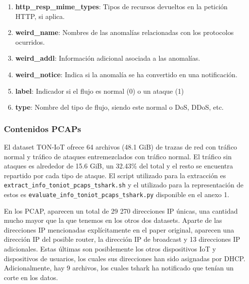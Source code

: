 \begin{enumerate}
  \item \textbf{http\_resp\_mime\_types}: Tipos de recursos devueltos en la petición HTTP, si aplica.
  \item \textbf{weird\_name}: Nombres de las anomalías relacionadas con los protocolos ocurridos.
  \item \textbf{weird\_addl}: Información adicional asociada a las anomalías.
  \item \textbf{weird\_notice}: Indica si la anomalía se ha convertido en una notificación.
  \item \textbf{label}: Indicador si el flujo es normal (0) o un ataque (1)
  \item \textbf{type}: Nombre del tipo de flujo, siendo este normal o DoS, DDoS, etc.
\end{enumerate}

\subsubsection{Contenidos PCAPs}

El dataset TON-IoT ofrece 64 archivos (48.1 GiB) de trazas de red con tráfico normal y tráfico de  ataques entremezclados con tráfico normal. El tráfico sin ataques es alrededor de 15.6 GiB, un 32.43\% del total y el resto se encuentra repartido por cada tipo de ataque. El script utilizado para la extracción es \texttt{extract\_info\_toniot\_pcaps\_tshark.sh} y el utilizado para la representación de estos es \texttt{evaluate\_info\_toniot\_pcaps\_tshark.py} disponible en el anexo 1.

En los PCAP, aparecen un total de 29 270 direcciones IP únicas, una cantidad mucho mayor que la que tenemos en los otros dos datasets. Aparte de las direcciones IP mencionadas explícitamente en el paper original, aparecen una dirección IP del posible router, la dirección IP de broadcast y 13 direcciones IP adicionales. Estas últimas son posiblemente los otros dispositivos IoT y dispositivos de usuarios, los cuales sus direcciones han sido asignadas por DHCP. Adicionalmente, hay 9 archivos, los cuales tshark ha notificado que tenían un corte en los datos.


